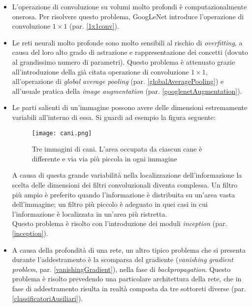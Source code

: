 \begin{itemize}

\item L'operazione di convoluzione su volumi molto profondi è computazionalmente onerosa. Per risolvere questo problema, GoogLeNet introduce l'operazione di convoluzione $1\times 1$ (par. \ref{1x1conv}).

\item Le reti neurali molto profonde sono molto sensibili al rischio di \textit{overfitting}, a causa del loro alto grado di astrazione e rappresentazione dei concetti (dovuto al grandissimo numero di parametri). Questo problema è attenuato grazie all'introduzione della già citata operazione di convoluzione $1\times 1$, all'operazione di \textit{global average pooling} (par. \ref{globalAveragePooling}) e all'usuale pratica della \textit{image augmentation} (par. \ref{googlenetAugmentation}).

\item Le parti salienti di un'immagine possono avere delle dimensioni estremamente variabili all'interno di essa. Si guardi ad esempio la figura seguente: 

\begin{figure}[h!] 
\centering
\texttt{[image: cani.png]}
\caption{Tre immagini di cani. L'area occupata da ciascun cane è differente e via via più piccola in ogni immagine}
\label{fig:cani}
\end{figure}

A causa di questa grande variabilità nella localizzazione dell'informazione la scelta delle dimensioni dei filtri convoluzionali diventa complessa. Un filtro più ampio è preferito quando l'informazione è distribuita su un'area vasta dell'immagine; un filtro più piccolo è adeguato in quei casi in cui l'informazione è localizzata in un'area più ristretta.\\
Questo problema è risolto con l'introduzione dei moduli \textit{inception} (par. \ref{inception}).

\item A causa della profondità di una rete, un altro tipico problema che si presenta durante l'addestramento è la scomparsa del gradiente (\textit{vanishing gradient problem}, par. \ref{vanishingGradient}), nella fase di \textit{backpropagation}. Questo problema è risolto prevedendo una particolare architettura della rete, che in fase di addestramento risulta in realtà composta da tre sottoreti diverse (par. \ref{classificatoriAusiliari}).

\end{itemize}


